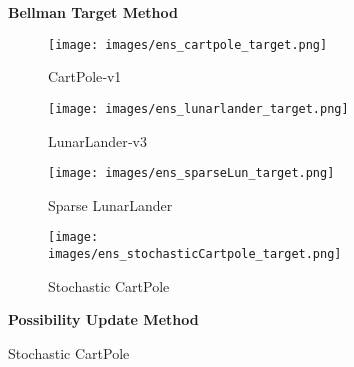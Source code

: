 \documentclass[11pt,a4paper]{report}
\begin{document}
{ %
\sloppy %

\begin{figure}[ht]
  \centering

  \par\noindent\textbf{Bellman Target Method}\par\nopagebreak
  \vspace{0.5em} %

  \begin{subfigure}[b]{0.24\textwidth}
    \centering
    \texttt{[image: images/ens\_cartpole\_target.png]}
    \caption{CartPole‐v1} %
  \end{subfigure}
  \hfill %
  \begin{subfigure}[b]{0.24\textwidth}
    \centering
    \texttt{[image: images/ens\_lunarlander\_target.png]}
    \caption{LunarLander‐v3} %
  \end{subfigure}
  \hfill %
  \begin{subfigure}[b]{0.24\textwidth}
    \centering
    \texttt{[image: images/ens\_sparseLun\_target.png]}
    \caption{Sparse LunarLander} %
  \end{subfigure}
  \hfill %
  \begin{subfigure}[b]{0.24\textwidth}
    \centering
    \texttt{[image: images/ens\_stochasticCartpole\_target.png]}
    \caption{Stochastic CartPole} %
  \end{subfigure}

  \vspace{1em} %

  \par\noindent\textbf{Possibility Update Method}\par\nopagebreak
  \vspace{0.5em} %


\end{figure}}
\end{document}
